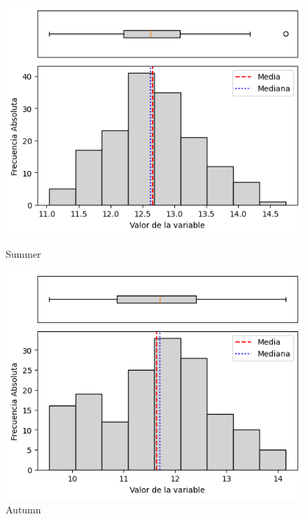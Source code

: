 \begin{figure}[H]
\centering
\begin{minipage}{0.30\textwidth}
  \includegraphics[width=\linewidth]{resultados/por_estacion_del_anio/boxplot_clases_por_estacion/Ancachuro/T_HistBoxplot_Summer.png}
  \caption*{Summer}
\end{minipage}
\hfill
\begin{minipage}{0.30\textwidth}
  \includegraphics[width=\linewidth]{resultados/por_estacion_del_anio/boxplot_clases_por_estacion/Ancachuro/T_HistBoxplot_Autumn.png}
  \caption*{Autumn}
\end{minipage}

\vspace{0.2cm}


\end{figure}
